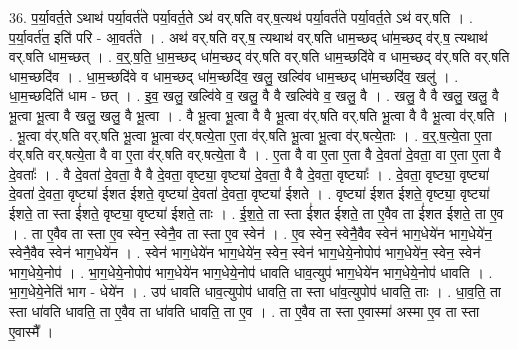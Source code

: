 \documentclass[17pt]{extarticle}
\begin{document}
36. प॒र्या॒वर्त॒ते ऽथाथ॑ पर्या॒वर्त॑ते पर्या॒वर्त॒ते ऽथ॑ वर्.षति वर्.ष॒त्यथ॑ पर्या॒वर्त॑ते पर्या॒वर्त॒ते ऽथ॑ वर्.षति । . प॒र्या॒वर्त॑त॒ इति॑ परि - आ॒वर्त॑ते । . अथ॑ वर्.षति वर्.ष॒ त्यथाथ॑ वर्.षति धाम॒च्छद् धा॑म॒च्छद् व॑र्.ष॒ त्यथाथ॑ वर्.षति धाम॒च्छत् । . व॒र्॒.ष॒ति॒ धा॒म॒च्छद् धा॑म॒च्छद् व॑र्.षति वर्.षति धाम॒च्छदि॑वे व धाम॒च्छद् व॑र्.षति वर्.षति धाम॒च्छदि॑व । . धा॒म॒च्छदि॑वे व धाम॒च्छद् धा॑म॒च्छदि॑व॒ खलु॒ खल्वि॑व धाम॒च्छद् धा॑म॒च्छदि॑व॒ खलु॑ । . धा॒म॒च्छदिति॑ धाम - छत् । . इ॒व॒ खलु॒ खल्वि॑वे व॒ खलु॒ वै वै खल्वि॑वे व॒ खलु॒ वै । . खलु॒ वै वै खलु॒ खलु॒ वै भू॒त्वा भू॒त्वा वै खलु॒ खलु॒ वै भू॒त्वा । . वै भू॒त्वा भू॒त्वा वै वै भू॒त्वा व॑र्.षति वर्.षति भू॒त्वा वै वै भू॒त्वा व॑र्.षति । . भू॒त्वा व॑र्.षति वर्.षति भू॒त्वा भू॒त्वा व॑र्.षत्ये॒ता ए॒ता व॑र्.षति भू॒त्वा भू॒त्वा व॑र्.षत्ये॒ताः । . व॒र्॒.ष॒त्ये॒ता ए॒ता व॑र्.षति वर्.षत्ये॒ता वै वा ए॒ता व॑र्.षति वर्.षत्ये॒ता वै । . ए॒ता वै वा ए॒ता ए॒ता वै दे॒वता॑ दे॒वता॒ वा ए॒ता ए॒ता वै दे॒वताः᳚ । . वै दे॒वता॑ दे॒वता॒ वै वै दे॒वता॒ वृष्ट्या॒ वृष्ट्या॑ दे॒वता॒ वै वै दे॒वता॒ वृष्ट्याः᳚ । . दे॒वता॒ वृष्ट्या॒ वृष्ट्या॑ दे॒वता॑ दे॒वता॒ वृष्ट्या॑ ईशत ईशते॒ वृष्ट्या॑ दे॒वता॑ दे॒वता॒ वृष्ट्या॑ ईशते । . वृष्ट्या॑ ईशत ईशते॒ वृष्ट्या॒ वृष्ट्या॑ ईशते॒ ता स्ता ई॑शते॒ वृष्ट्या॒ वृष्ट्या॑ ईशते॒ ताः । . ई॒श॒ते॒ ता स्ता ई॑शत ईशते॒ ता ए॒वैव ता ई॑शत ईशते॒ ता ए॒व । . ता ए॒वैव ता स्ता ए॒व स्वेन॒ स्वेनै॒व ता स्ता ए॒व स्वेन॑ । . ए॒व स्वेन॒ स्वेनै॒वैव स्वेन॑ भाग॒धेये॑न भाग॒धेये॑न॒ स्वेनै॒वैव स्वेन॑ भाग॒धेये॑न । . स्वेन॑ भाग॒धेये॑न भाग॒धेये॑न॒ स्वेन॒ स्वेन॑ भाग॒धेये॒नोपोप॑ भाग॒धेये॑न॒ स्वेन॒ स्वेन॑ भाग॒धेये॒नोप॑ । . भा॒ग॒धेये॒नोपोप॑ भाग॒धेये॑न भाग॒धेये॒नोप॑ धावति धाव॒त्युप॑ भाग॒धेये॑न भाग॒धेये॒नोप॑ धावति । . भा॒ग॒धेये॒नेति॑ भाग - धेये॑न । . उप॑ धावति धाव॒त्युपोप॑ धावति॒ ता स्ता धा॑व॒त्युपोप॑ धावति॒ ताः । . धा॒व॒ति॒ ता स्ता धा॑वति धावति॒ ता ए॒वैव ता धा॑वति धावति॒ ता ए॒व । . ता ए॒वैव ता स्ता ए॒वास्मा॑ अस्मा ए॒व ता स्ता ए॒वास्मै᳚ । \newline
\pagebreak
{}
\end{document}
